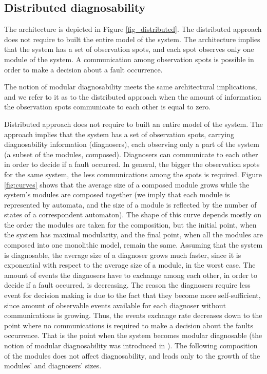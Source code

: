 \subsection{Distributed diagnosability}
The architecture is depicted in Figure \ref{fig_distributed}.
The distributed approach does not require to built the entire model of the
system. The architecture implies that the system has a set of observation spots,
and each spot observes only one module of the system. A communication among
observation spots is possible in order to make a decision about a fault
occurrence. 


The notion of modular diagnosability meets the same architectural implications,
and we refer to it as to the distributed approach when the amount of information
the observation spots communicate to each other is equal to zero.

Distributed approach does not require to built an entire model of the system.
The approach implies that the system has a set of observation spots, carrying
diagnosability information (diagnosers), each observing only a part of the
system (a subset of the modules, composed). Diagnosers can communicate to each
other in order to decide if a fault occurred. In general, the bigger the
observation spots for the same system, the less communications among the spots
is required.
Figure \ref{fig:curves} shows that the average size of a composed module grows
while the system's modules are composed together (we imply that each module is
represented by automata, and the size of a module is reflected by the number of
states of a correspondent automaton).
The shape of this curve depends mostly on the order the modules are taken for
the composition, but the initial point, when the system has maximal modularity,
and the final point, when all the modules are composed into one monolithic
model, remain the same. Assuming that the system is diagnosable, the average
size of a diagnoser grows much faster, since it is exponential with respect to
the average size of a module, in the worst case.
The amount of events the diagnosers have to exchange among each other, in order
to decide if a fault occurred, is decreasing. The reason the diagnosers require
less event for decision making is due to the fact that they become more
self-sufficient, since amount of observable events available for each
diagnoser without communications is growing. Thus, the events exchange rate
decreases down to the point where no communications is required to make a
decision about the faults occurrence. That is the point when the system becomes
modular diagnosable (the notion of modular diagnosability was introduced in
\cite{contant_diagnosability_2006}). The following composition of the modules
does not affect diagnosability, and leads only to the growth of the modules' and
diagnosers' sizes.

